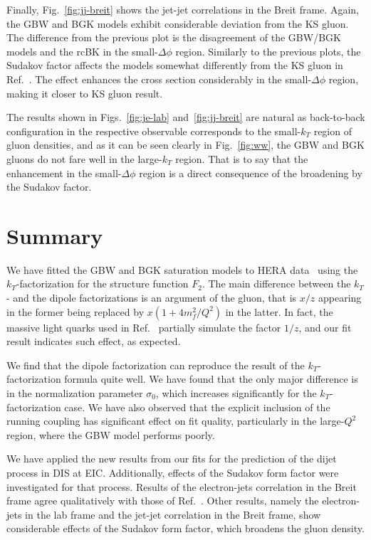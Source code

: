 \documentclass[11pt]{article}
\begin{document}
Finally, Fig.~\ref{fig:jj-breit} shows the jet-jet correlations in the Breit
frame. Again, the GBW and BGK models exhibit considerable deviation from the KS
gluon. The difference from the previous plot is the disagreement of the GBW/BGK
models and the rcBK in the small-$\Delta\phi$ region. Similarly to the previous
plots, the Sudakov factor affects the models somewhat differently from the KS
gluon in Ref.~\cite{vanHameren:2021sqc}.  The effect enhances the cross section
considerably in the small-$\Delta\phi$ region, making it closer to KS gluon
result.  

The results shown in Figs.~\ref{fig:je-lab} and~\ref{fig:jj-breit} are
natural as back-to-back configuration in the respective observable corresponds
to the small-$k_T$ region of gluon densities, and as it can be seen clearly in
Fig.~\ref{fig:ww}, the GBW and BGK gluons do not fare well in the large-$k_T$
region.  That is to say that the enhancement in the small-$\Delta\phi$ region is
a direct consequence of the broadening by the Sudakov factor. 

\section{Summary}

We have fitted the GBW and BGK saturation models to HERA data~\cite{Abt:2017nkc}
using the $k_T$-factorization for the structure function $F_2$.  The main
difference between the $k_T$- and the dipole factorizations is an argument of
the gluon, that is $x/z$ appearing in the former being replaced by
$x(1+4m_f^2/Q^2)$ in the latter. 
%
In fact, the massive light quarks used in Ref.~\cite{Golec-Biernat:1998zce}
partially simulate the factor $1/z$, and our fit result indicates such effect,
as expected. 
 
We find that the dipole factorization can
reproduce the result of the $k_T$-factorization formula quite well. We have found that
the only major difference is in the normalization parameter $\sigma_0$, which
increases significantly for the $k_T$-factorization case. We have also observed
that the explicit inclusion of the running coupling has significant effect on
fit quality, particularly in the large-$Q^2$ region, where the GBW model
performs poorly. 

We have applied the new results from our fits for the prediction of the dijet
process in DIS at EIC. Additionally, effects of the Sudakov form factor were
investigated for that process. Results of the electron-jets correlation in the
Breit frame agree qualitatively with those of Ref.~\cite{vanHameren:2021sqc}.
Other results, namely the electron-jets in the lab frame and the jet-jet
correlation in the Breit frame, show considerable effects of the Sudakov form
factor, which broadens the gluon density. 
\end{document}
